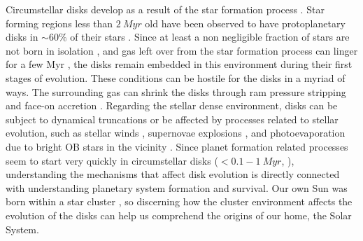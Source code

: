 \documentclass[fleqn,usenatbib]{mnras}
\newcommand\note[1]{{\colorbox{yellow!60}{\color{magenta}#1}}}
\begin{document}
Circumstellar disks develop as a result of the star formation process \citep{williams2011}. Star forming regions less than $\SI{2}{Myr}$ old have been observed to have protoplanetary disks in $\sim60\%$ of their stars \citep{fedele2010}. \note{Since at least a non negligible fraction of stars are not born in isolation} \citep{bressert2010,king2012}, and gas left over from the star formation process can linger for a few Myr \citep{goodwin2009,portegieszwart2010}, the disks remain embedded in this environment during their first stages of evolution. These conditions can be hostile for the disks in a myriad of ways. The surrounding gas can shrink the disks through ram pressure stripping and face-on accretion \citep{wijnen2016, wijnen2017}. Regarding the stellar dense environment, disks can be subject to dynamical truncations \citep{vincke2015,portegieszwart2016,vincke2016} or be affected by processes related to stellar evolution, such as stellar winds \citep{pelupessy2012}, supernovae explosions \citep{close2017}, and photoevaporation due to bright OB stars in the vicinity \citep[e.g.][]{guarcello2016,haworth2017}. Since planet formation related processes seem to start very quickly in circumstellar disks ($< 0.1 - \SI{1}{Myr}$, \citet{najita2014,manara2018}), understanding the mechanisms that affect disk evolution is directly connected with understanding planetary system formation and survival. Our own Sun was born within a star cluster \citep{portegieszwart2009}, so discerning how the cluster environment affects the evolution of the disks can help us comprehend the origins of our home, the Solar System. 
\end{document}
